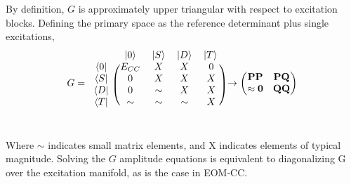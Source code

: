 By definition, $G$ is approximately upper triangular with respect to excitation blocks. Defining the primary space as the reference determinant plus single excitations, 
\begin{equation}
G = 
\begin{blockarray}{ccccc}
 &\ket{0} & \ket{S} & \ket{D} & \ket{T}  \\
\begin{block}{c(cccc)}
\bra{0} & E_{CC} & X & X & 0 \\
\bra{S} &0 & X & X & X \\
\bra{D} & 0 & \sim & X & X \\
\bra{T} & \sim & \sim& \sim& X \\
\end{block}
\end{blockarray}
\rightarrow \begin{pmatrix}
\mathbf{PP} & \mathbf{PQ} \\
\mathbf{\approx 0} & \mathbf{QQ} \\
\end{pmatrix}
\end{equation}
\\ Where $\sim$ indicates small matrix elements, and X indicates elements of typical magnitude. Solving the $G$ amplitude equations is equivalent to diagonalizing G over the excitation manifold, as is the case in EOM-CC. 

